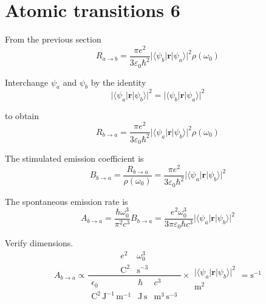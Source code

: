 

\section*{Atomic transitions 6}

From the previous section
\begin{equation*}
R_{a\rightarrow b}
=\frac{\pi e^2}{3\varepsilon_0\hbar^2}
\bigl|\langle\psi_b|\mathbf r|\psi_a\rangle\bigr|^2\rho(\omega_0)
\end{equation*}

Interchange $\psi_a$ and $\psi_b$ by the identity
\begin{equation*}
\bigl|\langle\psi_a|\mathbf r|\psi_b\rangle\bigr|^2
=\bigl|\langle\psi_b|\mathbf r|\psi_a\rangle\bigr|^2
\end{equation*}

to obtain
\begin{equation*}
R_{b\rightarrow a}
=\frac{\pi e^2}{3\varepsilon_0\hbar^2}
\bigl|\langle\psi_a|\mathbf r|\psi_b\rangle\bigr|^2\rho(\omega_0)
\end{equation*}

The stimulated emission coefficient is
\begin{equation*}
B_{b\rightarrow a}=\frac{R_{b\rightarrow a}}{\rho(\omega_0)}
=\frac{\pi e^2}{3\varepsilon_0\hbar^2}
\bigl|\langle\psi_a|\mathbf r|\psi_b\rangle\bigr|^2
\end{equation*}

The spontaneous emission rate is
\begin{equation*}
A_{b\rightarrow a}=\frac{\hbar\omega_0^3}{\pi^2c^3}B_{b\rightarrow a}
=\frac{e^2\omega_0^3}{3\pi\varepsilon_0\hbar c^3}
\bigl|\langle\psi_a|\mathbf r|\psi_b\rangle\bigr|^2
\tag{1}
\end{equation*}

Verify dimensions.
\begin{equation*}
A_{b\rightarrow a}\propto
\frac{
\begin{matrix}
e^2 & \omega_0^3
\\
\text{C}^2 & \text{s}^{-3}
\end{matrix}
}
{
\begin{matrix}
\epsilon_0 & \hbar & c^3
\\
\text{C}^2\,\text{J}^{-1}\,\text{m}^{-1}
& \text{J}\,\text{s}
& \text{m}^3\,\text{s}^{-3}
\end{matrix}
}
\times
\begin{matrix}
\\
\bigl|\langle\psi_a|\mathbf r|\psi_b\rangle\bigr|^2
\\
\text{m}^2
\end{matrix}
=\text{s}^{-1}
\end{equation*}


